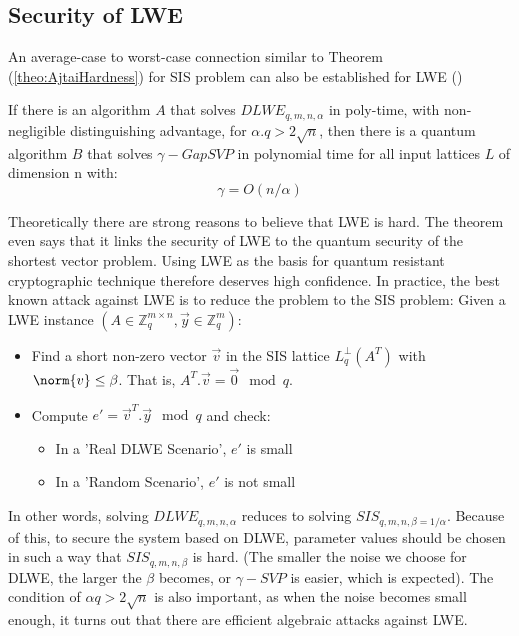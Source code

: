 \subsection{Security of LWE}
\label{sec:LWESecurity}
An average-case to worst-case connection similar to Theorem
(\ref{theo:AjtaiHardness}) for SIS problem can also be established for LWE
(\cite{regev2005lattices})
\begin{theorem}
  If there is an algorithm $A$ that solves $DLWE_{q,m,n,\alpha}$ in poly-time,
  with non-negligible distinguishing advantage, for $\alpha . q > 2
  \sqrt{n}$, then there is a quantum algorithm $B$ that solves $\gamma-GapSVP$
  in polynomial time for all input lattices $L$ of dimension n with:
  \[
    \gamma = O(n/\alpha)
  \]

  \label{theo:RegevLWEHardness}
\end{theorem}
Theoretically there are strong reasons to believe that LWE is hard. The theorem
even says that it links the security of LWE to the quantum security of the
shortest vector problem. Using LWE as the basis for quantum resistant cryptographic technique  therefore deserves high confidence. In practice, the best known
attack against LWE is to reduce the problem to the SIS problem: Given a LWE
instance $(A \in \mathbb{Z}_q^{m \times n},\vec{y} \in \mathbb{Z}_q^m)$:
\begin{itemize}
\item Find a short non-zero vector $\vec{v}$ in the SIS lattice $L_q^\bot(A^T)$
  with $\norm{v} \leq \beta$. That is, $A^T.\vec{v} = \vec{0} \mod q$.
\item Compute $e' = \vec{v}^T.\vec{y} \mod q$ and check:
  \begin{itemize}
  \item In a 'Real DLWE Scenario', $e'$ is small
  \item In a 'Random Scenario', $e'$ is not small
  \end{itemize}
\end{itemize}

In other words, solving $DLWE_{q,m,n,\alpha}$ reduces to solving
$SIS_{q,m,n,\beta=1/\alpha}$. Because of this, to secure the system based on DLWE, parameter values should be chosen in such a way that $SIS_{q,m,n,\beta}$ is hard. (The smaller the
noise we choose for DLWE, the larger the $\beta$ becomes, or $\gamma-SVP$ is
easier, which is expected).  The condition of $\alpha q > 2\sqrt{n}$ is
also important, as when the noise becomes small enough, it turns out that there
are efficient algebraic attacks against LWE.


